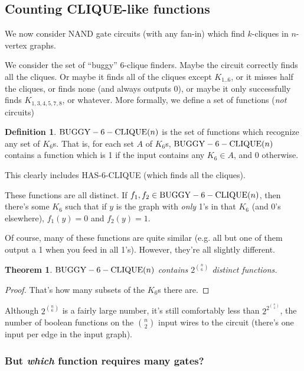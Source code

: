 \documentclass[12pt]{article}
\newtheorem{thm}{Theorem}[section]
\theoremstyle{definition}
\newtheorem{defn}{Definition}[section]
\begin{document}
\subsection{Counting CLIQUE-like functions}

We now consider NAND gate circuits (with any fan-in) which find $k$-cliques in $n$-vertex
graphs.

We consider the set of ``buggy'' 6-clique finders. 
Maybe the circuit correctly
finds all the cliques. Or maybe it finds all of the cliques except $K_{1..6}$,
or it misses half the cliques, or finds none (and always outputs 0), or maybe
it only successfully finds $K_{1,3,4,5,7,8}$, or whatever. More formally,
we define a set of functions ({\em not} circuits)

\begin{defn}
\label{BUGGY-6-CLIQUE}
${\rm BUGGY-6-CLIQUE}(n)$ is the set of functions which recognize any set
of $K_6$s. That is, for each set $A$ of $K_6$s, ${\rm BUGGY-6-CLIQUE}(n)$
contains a function which is 1 if the input contains any $K_6 \in A$,
and 0 otherwise.
\end{defn}

This clearly includes HAS-6-CLIQUE (which finds all the cliques).

These functions are all distinct. If $f_1, f_2 \in {\rm BUGGY-6-CLIQUE}(n)$,
then there's some $K_6$ such that if $y$ is the graph with {\em only}
1's in that $K_6$ (and 0's elsewhere), $f_1(y) = 0$ and $f_2(y) = 1$.

Of course, many of these functions are quite similar (e.g. all but one of them
output a 1 when you feed in all 1's). However, they're all slightly different.

\begin{thm}
\label{buggyDistinct}
${\rm BUGGY-6-CLIQUE}(n)$ contains $2^{n \choose 6}$ distinct functions.
\end{thm}
\begin{proof}
That's how many subsets of the $K_6$s there are.
\end{proof}

Although $2^{n \choose 6}$ is a fairly large number,
it's still comfortably less than $2^{2^{n \choose 2}}$, the number of boolean
functions on the ${n \choose 2}$ input wires to the circuit (there's one input
per edge in the input graph).

\subsubsection{But {\em which} function requires many gates?}
\end{document}
